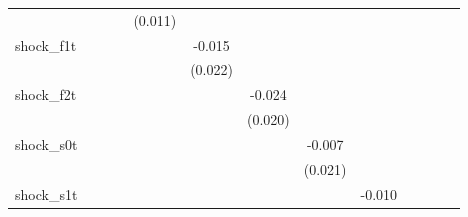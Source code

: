 {\begin{tabular}{l*{12}{c}}
            &                     &                     &                     &     (0.011)         &                     &                     &                     &                     &                     &                     &                     &                     \\
\addlinespace
shock\_f1t   &                     &                     &                     &                     &      -0.015         &                     &                     &                     &                     &                     &                     &                     \\
            &                     &                     &                     &                     &     (0.022)         &                     &                     &                     &                     &                     &                     &                     \\
\addlinespace
shock\_f2t   &                     &                     &                     &                     &                     &      -0.024         &                     &                     &                     &                     &                     &                     \\
            &                     &                     &                     &                     &                     &     (0.020)         &                     &                     &                     &                     &                     &                     \\
\addlinespace
shock\_s0t   &                     &                     &                     &                     &                     &                     &      -0.007         &                     &                     &                     &                     &                     \\
            &                     &                     &                     &                     &                     &                     &     (0.021)         &                     &                     &                     &                     &                     \\
\addlinespace
shock\_s1t   &                     &                     &                     &                     &                     &                     &                     &      -0.010         &                     &                     &                     &                     \\

\end{tabular}}
